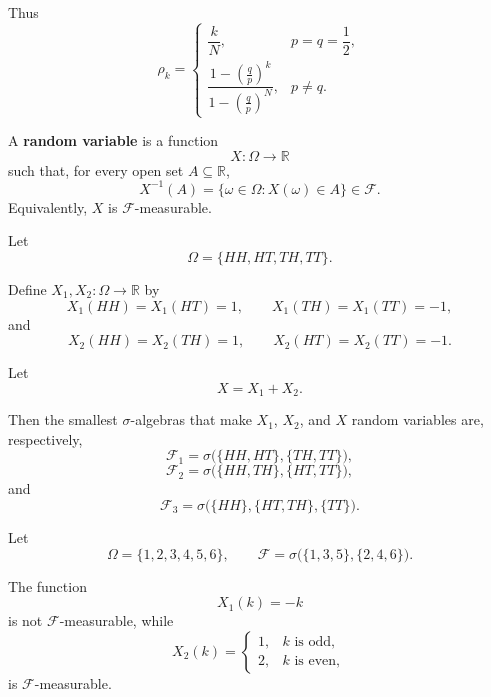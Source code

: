 \begin{exampleenv}
    Thus
    \[
        \boxed{
        \rho_k
        =
        \begin{cases}
            \dfrac{k}{N},
            & p=q=\dfrac12, \\[1.2ex]
            \dfrac{
                1-\left(\frac{q}{p}\right)^k
            }{
                1-\left(\frac{q}{p}\right)^N
            },
            & p\ne q.
        \end{cases}}
    \]
\end{exampleenv}

\begin{definitionenv}
A \textbf{random variable} is a function
\[
    X:\Omega\to\mathbb R
\]
such that, for every open set $A\subseteq\mathbb R$,
\[
    X^{-1}(A)
    =
    \{\omega\in\Omega:X(\omega)\in A\}
    \in\mathcal F.
\]
Equivalently, $X$ is $\mathcal F$-measurable.
\end{definitionenv}

\begin{exampleenv}

Let
\[
    \Omega=\{HH,HT,TH,TT\}.
\]

Define $X_1,X_2:\Omega\to\mathbb R$ by
\[
    X_1(HH)=X_1(HT)=1,
    \qquad
    X_1(TH)=X_1(TT)=-1,
\]
and
\[
    X_2(HH)=X_2(TH)=1,
    \qquad
    X_2(HT)=X_2(TT)=-1.
\]

Let
\[
    X=X_1+X_2.
\]

Then the smallest $\sigma$-algebras that make $X_1$, $X_2$, and $X$
random variables are, respectively,
\[
    \mathcal F_1
    =
    \sigma\bigl(\{HH,HT\},\{TH,TT\}\bigr),
\]
\[
    \mathcal F_2
    =
    \sigma\bigl(\{HH,TH\},\{HT,TT\}\bigr),
\]
and
\[
    \mathcal F_3
    =
    \sigma\bigl(\{HH\},\{HT,TH\},\{TT\}\bigr).
\]

\end{exampleenv}

\begin{exampleenv}
Let
\[
    \Omega=\{1,2,3,4,5,6\},
    \qquad
    \mathcal F
    =
    \sigma\bigl(\{1,3,5\},\{2,4,6\}\bigr).
\]

The function
\[
    X_1(k)=-k
\]
is not $\mathcal F$-measurable, while
\[
    X_2(k)
    =
    \begin{cases}
        1, & k \text{ is odd},\\
        2, & k \text{ is even},
    \end{cases}
\]
is $\mathcal F$-measurable.
\end{exampleenv}

